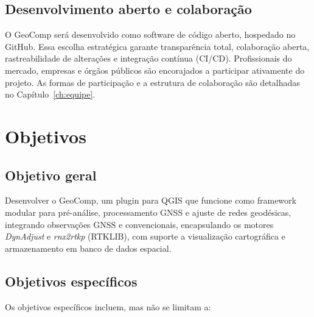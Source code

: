 \documentclass[
        12pt,                           %
        openright,                      %
        oneside,
        a4paper,                        %
        chapter=TITLE,         %
        section=TITLE,         %
        subsection=Title,      %
        english,                        %
        portugues,                      %
        ]{abntex2}
\begin{document}
\section{Desenvolvimento aberto e colaboração}

O GeoComp será desenvolvido como software de código aberto, hospedado no GitHub. Essa escolha estratégica garante transparência total, colaboração aberta, rastreabilidade de alterações e integração contínua (CI/CD). Profissionais do mercado, empresas e órgãos públicos são encorajados a participar ativamente do projeto. As formas de participação e a estrutura de colaboração são detalhadas no Capítulo~\ref{ch:equipe}.

\chapter{Objetivos}

\section{Objetivo geral}

Desenvolver o GeoComp, um plugin para QGIS que funcione como framework modular para pré-análise, processamento GNSS e ajuste de redes geodésicas, integrando observações GNSS e convencionais, encapsulando os motores \textit{DynAdjust} e \textit{rnx2rtkp} (RTKLIB), com suporte a visualização cartográfica e armazenamento em banco de dados espacial.


\section{Objetivos específicos}

Os objetivos específicos incluem, mas não se limitam a:
\end{document}
